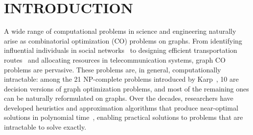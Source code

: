 \pagestyle{plain} %
\setcounter{page}{1}

\chapter{\uppercase {Introduction}}

A wide range of computational problems in science and engineering naturally
arise as combinatorial optimization (CO) problems on graphs. From
identifying influential individuals in social
networks~\citep{kempe2003maximizing} to designing efficient transportation
routes~\citep{sun2021generalization} and allocating resources in telecommunication
systems, graph CO problems are pervasive. These problems are, in general, computationally intractable: among the 21 NP-complete
problems introduced by Karp~\citep{karp2009reducibility}, 10 are decision versions of
graph optimization problems, and most of the remaining ones can be naturally reformulated
on graphs. Over
the decades, researchers have developed heuristics and approximation algorithms that
produce near-optimal solutions in polynomial
time~\citep{nemhauser1978analysis, kempe2003maximizing, tang2015influence}, enabling
practical solutions to problems that are intractable to solve exactly.


